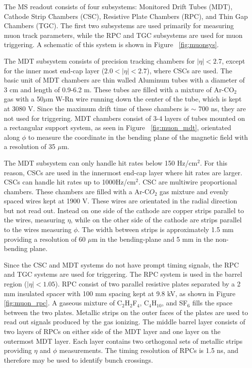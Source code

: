 The MS readout consists of four subsystems: Monitored Drift Tubes (MDT), Cathode Strip Chambers (CSC), Resistive Plate Chambers (RPC), and Thin Gap Chambers (TGC). The first two subsystems are used primarily for measuring muon track parameters, while the RPC and TGC subsystems are used for muon triggering. A schematic of this system is shown in Figure ~\ref{fig:muonsys}. 

The MDT subsystem consists of precision tracking chambers for $|\eta|<2.7$, except for the inner most end-cap layer ($2.0 < |\eta| < 2.7$), where CSCs are used. The basic unit of MDT chambers are thin walled Aluminum tubes with a diameter of 3 cm and length of 0.9-6.2 m. These tubes are filled with a mixture of Ar-CO$_{2}$ gas with a  50$\mu$m W-Rn wire running down the center of the tube, which is kept at 3080 V. Since the maximum drift time of these chambers is $\sim$ 700 ns, they are not used for triggering. MDT chambers consist of 3-4 layers of tubes mounted on a rectangular support system, as seen in Figure ~\ref{fig:muon_mdt}, orientated along $\phi$ to measure the coordinate in the bending plane of the magnetic field with a resolution of 35 $\mu$m.

The MDT subsystem can only handle hit rates below 150 Hz/cm$^{2}$. For this reason, CSCs are used in the innermost end-cap layer where hit rates are larger. CSCs can handle hit rates up to 1000Hz/cm$^{2}$. CSC are multiwire proportional chambers. These chambers are filled with a Ar-C$O_{2}$ gas mixture and evenly spaced wires kept at 1900 V. These wires are orientated in the radial direction but not read out. Instead on one side of the cathode are copper strips parallel to the wires, measuring $\eta$, while on the other side of the cathode are strips parallel to the wires measuring $\phi$. The width between strips is approximately 1.5 mm providing a resolution of 60 $\mu$m in the bending-plane and 5 mm in the non-bending plane. 

Since the CSC and MDT systems do not have prompt timing signals, the RPC and TGC systems are used for triggering. The RPC system is used in the barrel region ($|\eta| < 1.05$). RPC consist of two parallel resistive plates separated by a 2 mm insulated spacer with 100 mm spacing kept at 9.8 kV, as shown in Figure \ref{fig:muon_rpc}. A gaseous mixture of C$_{2}$H$_{2}$F$_{4}$, C$_{4}$H$_{10}$, and SF$_{6}$ fills the space between the two plates. Metallic strips on the outer faces of the plates are used to read out signals produced by the gas ionizing. The middle barrel layer consists of two layers of RPCs on either side of the MDT layer and one layer on the outermost MDT layer. Each layer contains two orthogonal sets of metallic strips providing $\eta$ and $\phi$ measurements. The timing resolution of RPCs is 1.5 ns, and therefore may be used to identify bunch crossings. 

